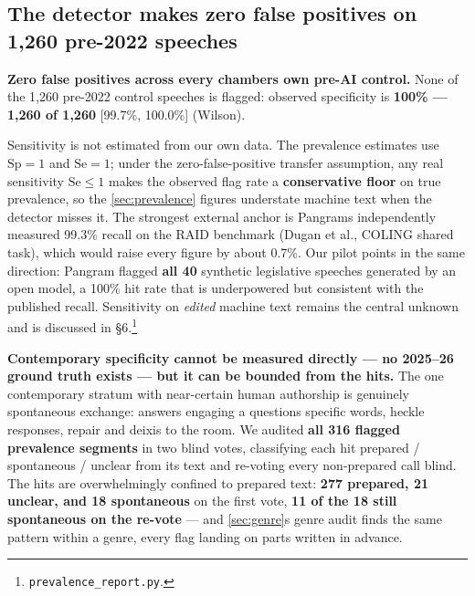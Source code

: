 \subsection{The detector makes zero false positives on 1,260 pre-2022 speeches}\label{sec:calibration}

\textbf{Zero false positives across every chamber\textquotesingle s own pre-AI control.} None of
the 1,260 pre-2022 control speeches is flagged: observed specificity is
\textbf{100\% --- 1,260 of 1,260} {[}99.7\%, 100.0\%{]} (Wilson).

Sensitivity is not estimated from our own data. The prevalence estimates use
\(\mathrm{Sp} = 1\) and \(\mathrm{Se} = 1\); under the zero-false-positive transfer assumption, any
real sensitivity \(\mathrm{Se} \leq 1\) makes the observed flag rate a \textbf{conservative
floor} on true prevalence, so the \cref{sec:prevalence} figures understate machine text when
the detector misses it. The strongest external anchor is Pangram\textquotesingle s
independently measured 99.3\% recall on the RAID benchmark (Dugan et al.,
COLING shared task), which would raise every figure by about 0.7\%. Our pilot
points in the same direction: Pangram flagged \textbf{all 40} synthetic legislative
speeches generated by an open model, a 100\% hit rate that is underpowered but
consistent with the published recall. Sensitivity on \emph{edited} machine text
remains the central unknown and is discussed in §6.\footnote{\texttt{prevalence\_report.py}.}

\textbf{Contemporary specificity cannot be measured directly --- no 2025--26 ground
truth exists --- but it can be bounded from the hits.} The one contemporary
stratum with near-certain human authorship is genuinely spontaneous exchange:
answers engaging a question\textquotesingle s specific words, heckle responses, repair and
deixis to the room. We audited \textbf{all 316 flagged prevalence segments} in two
blind votes, classifying each hit prepared / spontaneous / unclear from its
text and re-voting every non-prepared call blind. The hits are overwhelmingly
confined to prepared text: \textbf{277 prepared, 21 unclear, and 18 spontaneous} on
the first vote, \textbf{11 of the 18 still spontaneous on the re-vote} --- and \cref{sec:genre}\textquotesingle s
genre audit finds the same pattern within a genre, every flag landing on parts
written in advance.

